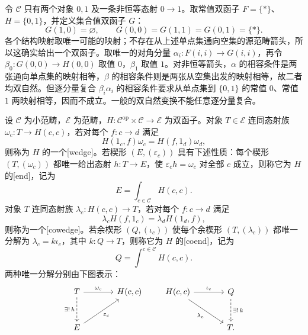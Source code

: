 \begin{example}[双自然变换的复合可能失败]\label{b4:exm:dinatural-noncomposition}
	令 \(\mathcal C\) 只有两个对象 \(0,1\) 及一条非恒等态射 \(0\rightarrow1\)。取常值双函子 \(F=\{*\}\)、\(H=\{0,1\}\)，并定义集合值双函子 \(G\)：
	\[
		G(1,0)=\varnothing,\qquad
		G(0,0)=G(1,1)=G(0,1)=\{*\}.
	\]
	各个结构映射取唯一可能的映射；不存在从上述单点集通向空集的源范畴箭头，所以这确实给出一个双函子。取唯一的对角分量 \(\alpha_i:F(i,i)\rightarrow G(i,i)\)，再令 \(\beta_0:G(0,0)\rightarrow H(0,0)\) 取值 \(0\)，\(\beta_1\) 取值 \(1\)。对非恒等箭头，\(\alpha\) 的相容条件是两张通向单点集的映射相等，\(\beta\) 的相容条件则是两张从空集出发的映射相等，故二者均双自然。但逐分量复合 \(\beta_i\alpha_i\) 的相容条件要求从单点集到 \(\{0,1\}\) 的常值 \(0\)、常值 \(1\) 两映射相等，因而不成立。一般的双自然变换不能任意逐分量复合。
\end{example}

\begin{definition}[楔形、端与余端]\label{b4:def:end-coend}
	设 \(\mathcal C\) 为小范畴，\(\mathcal E\) 为范畴，\(H:\mathcal C^{\mathrm{op}}\times\mathcal C\rightarrow\mathcal E\) 为双函子。对象 \(T\in\mathcal E\) 连同态射族 \(\omega_c:T\rightarrow H(c,c)\)，若对每个 \(f:c\rightarrow d\) 满足
	\[
		H(1_c,f)\omega_c=H(f,1_d)\omega_d,
	\]
	则称为 \(H\) 的一个[wedge]。若楔形 \((E,(\varepsilon_c))\) 具有下述性质：每个楔形 \((T,(\omega_c))\) 都唯一给出态射 \(h:T\rightarrow E\)，使 \(\varepsilon_ch=\omega_c\) 对全部 \(c\) 成立，则称它为 \(H\) 的[end]，记为
	\[
		E=\int_{c\in\mathcal C}H(c,c).
	\]
	对象 \(T\) 连同态射族 \(\lambda_c:H(c,c)\rightarrow T\)，若对每个 \(f:c\rightarrow d\) 满足
	\[
		\lambda_cH(f,1_c)=\lambda_dH(1_d,f),
	\]
	则称为一个[cowedge]。若余楔形 \((Q,(\iota_c))\) 使每个余楔形 \((T,(\lambda_c))\) 都唯一分解为 \(\lambda_c=k\iota_c\)，其中 \(k:Q\rightarrow T\)，则称它为 \(H\) 的[coend]，记为
	\[
		Q=\int^{c\in\mathcal C}H(c,c).
	\]
	两种唯一分解分别由下图表示：
	\[
		\begin{tikzcd}[column sep=large,row sep=large]
			T\arrow[r,"\omega_c"]\arrow[d,dashed,"\exists!\,h"']&H(c,c)\\
			E\arrow[ur,"\varepsilon_c"']&
		\end{tikzcd}
		\qquad
		\begin{tikzcd}[column sep=large,row sep=large]
			H(c,c)\arrow[r,"\iota_c"]\arrow[dr,"\lambda_c"']&Q\arrow[d,dashed,"\exists!\,k"]\\
			&T.
		\end{tikzcd}
	\]
\end{definition}

